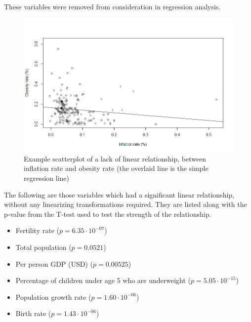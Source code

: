 \documentclass[oneside,12pt]{report}
\begin{document}
These variables were removed from consideration in regression analysis.

\begin{figure}
\centering
\caption{Example scatterplot of a lack of linear relationship, between inflation rate and obesity rate (the overlaid line is the simple regression line)}
\label{fig:inflation-obesity-scatter}
\includegraphics[width=\textwidth]{inflation-obrate-scatter.png}
\end{figure}

The following are those variables which had a significant linear relationship, without any linearizing transformations required. They are listed along with the p-value from the T-test used to test the strength of the relationship.

\begin{itemize}
\item Fertility rate (\begin{math}p=6.35\cdot10^{-07}\end{math})
\item Total population (\begin{math}p=0.0521\end{math})
\item Per person GDP (USD) (\begin{math}p=0.00525\end{math})
\item Percentage of children under age 5 who are underweight (\begin{math}p=5.05\cdot10^{-15}\end{math})
\item Population growth rate (\begin{math}p=1.60\cdot10^{-06}\end{math})
\item Birth rate (\begin{math}p=1.43\cdot10^{-06}\end{math})
\end{itemize}
\end{document}
